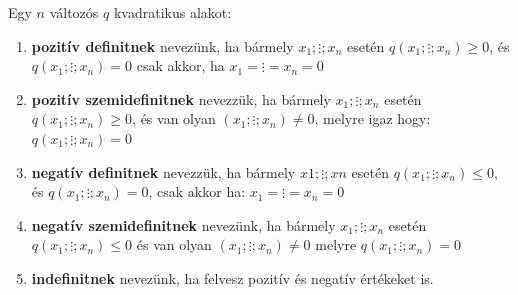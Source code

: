 \documentclass[11pt,a4paper]{article}
\begin{document}
\begin{tcolorbox}[colback=blue!5!white,colframe=blue!70!black,title= 8. Kvadratikus formák definitsége]
Egy \(n\) változós \(q\) kvadratikus alakot:
\begin{enumerate}
    \item \textbf{pozitív definitnek} nevezünk, ha bármely \(x_1; \vdots ; x_n\) esetén \(q(x_1; \vdots ; x_n) \geq 0\), és \(q(x_1; \vdots ; x_n) = 0\) csak akkor,
    ha \(x_1 = \vdots = x_n = 0\)
    \item \textbf{pozitív szemidefinitnek} nevezzük, ha bármely \(x_1; \vdots ; x_n\) esetén \(q(x_1; \vdots ; x_n) \geq 0\), és van olyan \((x_1; \vdots ; x_n) \neq 0\),
    melyre igaz hogy: \(q(x_1; \vdots ; x_n) = 0\)
    \item \textbf{negatív definitnek} nevezzük, ha bármely \(x1; \vdots ; xn\) esetén \(q(x_1; \vdots ; x_n) \leq 0\), és \(q(x_1;\vdots ; x_n) = 0\), csak akkor
    ha: \(x_1 = \vdots = x_n = 0\)
    \item \textbf{negatív szemidefinitnek} nevezünk, ha bármely \(x_1;\vdots ; x_n\) esetén \(q(x_1; \vdots ; x_n) \leq 0\) és van olyan \((x_1; \vdots ; x_n) \neq 0\)
    melyre \(q(x_1; \vdots ; x_n) = 0\)
    \item \textbf{indefinitnek} nevezünk, ha felvesz pozitív és negatív értékeket is.
\end{enumerate}
\end{tcolorbox}
\end{document}
